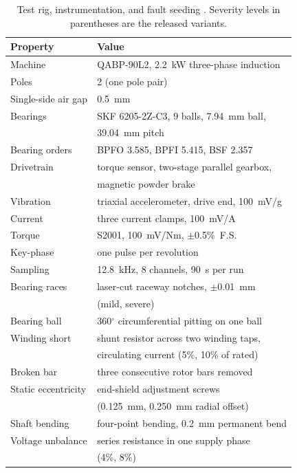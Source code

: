 \documentclass{ieeeaccess}
\begin{document}
\begin{table}[!t]
\caption{Test rig, instrumentation, and fault seeding
\cite{chen2026}. Severity levels in parentheses are the released variants.}
\label{tab:rig}
\centering
\footnotesize
\setlength{\tabcolsep}{4pt}
\begin{tabular}{l l}
\toprule
Property & Value \\
\midrule
Machine & QABP-90L2, 2.2~kW three-phase induction \\
Poles & 2 (one pole pair) \\
Single-side air gap & 0.5~mm \\
Bearings & SKF 6205-2Z-C3, 9 balls, 7.94~mm ball, \\
         & 39.04~mm pitch \\
Bearing orders & BPFO 3.585, BPFI 5.415, BSF 2.357 \\
Drivetrain & torque sensor, two-stage parallel gearbox, \\
           & magnetic powder brake \\
\midrule
Vibration & triaxial accelerometer, drive end, 100~mV/g \\
Current & three current clamps, 100~mV/A \\
Torque & S2001, 100~mV/Nm, $\pm$0.5\%~F.S. \\
Key-phase & one pulse per revolution \\
Sampling & 12.8~kHz, 8 channels, 90~s per run \\
\midrule
Bearing races & laser-cut raceway notches, $\pm$0.01~mm \\
              & (mild, severe) \\
Bearing ball & 360$^\circ$ circumferential pitting on one ball \\
Winding short & shunt resistor across two winding taps, \\
              & circulating current (5\%, 10\% of rated) \\
Broken bar & three consecutive rotor bars removed \\
Static eccentricity & end-shield adjustment screws \\
                    & (0.125~mm, 0.250~mm radial offset) \\
Shaft bending & four-point bending, 0.2~mm permanent bend \\
Voltage unbalance & series resistance in one supply phase \\
                  & (4\%, 8\%) \\
\bottomrule
\end{tabular}
\end{table}
\end{document}
